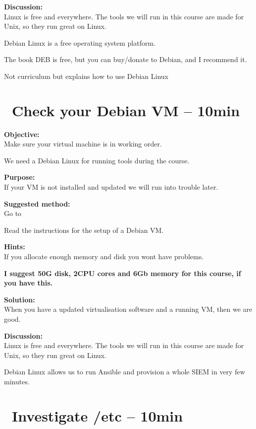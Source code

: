 \documentclass[a4paper,11pt,notitlepage]{report}
\begin{document}
{\bf Discussion:}\\
Linux is free and everywhere. The tools we will run in this course are made for Unix, so they run great on Linux.

Debian Linux is a free operating system platform.

The book DEB is free, but you can buy/donate to Debian, and I recommend it.

Not curriculum but explains how to use Debian Linux


\chapter{\faExclamationTriangle\ Check your Debian VM -- 10min}
\label{ex:sw-basicDebianVM}


{\bf Objective:}\\
Make sure your virtual machine is in working order.

We need a Debian Linux for running tools during the course.

{\bf Purpose:}\\
If your VM is not installed and updated we will run into trouble later.

{\bf Suggested method:}\\
Go to 

Read the instructions for the setup of a Debian VM.


{\bf Hints:}\\
If you allocate enough memory and disk you wont have problems.

{\bf I suggest 50G disk, 2CPU cores and 6Gb memory for this course, if you have this.}

{\bf Solution:}\\
When you have a updated virtualisation software and a running VM, then we are good.

{\bf Discussion:}\\
Linux is free and everywhere. The tools we will run in this course are made for Unix, so they run great on Linux.

Debian Linux allows us to run Ansible and provision a whole SIEM in very few minutes.


\chapter{\faInfoCircle\ Investigate /etc -- 10min}
\label{ex:sw-basicLinuxetc}
\end{document}
